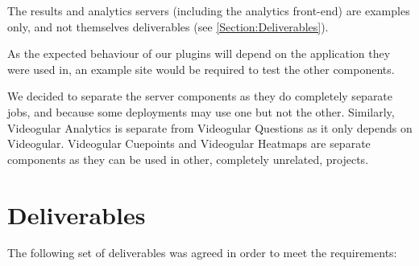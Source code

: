 The results and analytics servers (including the analytics front-end) are examples only, and not themselves deliverables (see \autoref{Section:Deliverables}).

As the expected behaviour of our plugins will depend on the application they were used in, an example site would be required to test the other components.


We decided to separate the server components as they do completely separate jobs, and because some deployments may use one but not the other. Similarly, Videogular Analytics is separate from Videogular Questions as it only depends on \gls{Videogular}. Videogular Cuepoints and Videogular Heatmaps are separate components as they can be used in other, completely unrelated, projects.

\section{Deliverables}
\label{Section:Deliverables}

The following set of deliverables was agreed in order to meet the requirements:

